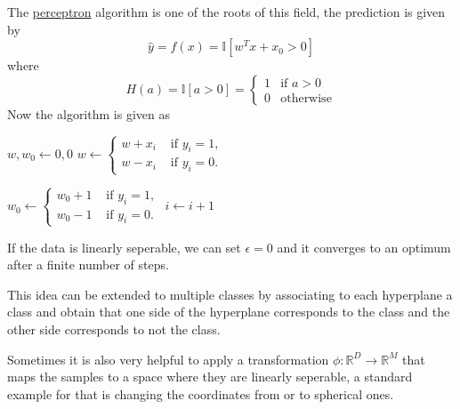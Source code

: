 \documentclass[12 pt]{article}        	%
\begin{document}
\begin{lem}
    The \underline{perceptron} algorithm is one of the roots of this field, the prediction is given by 
    \[
        \hat{y} = f ( x ) = \mathbb{ I } [ w^T x + x_0 > 0 ]
    \]
    where
    \[
        H ( a ) = \mathbb{ I }[ a > 0 ] = 
        \begin{cases}
            1 & \text{if } a > 0
            \\
            0 & \text{otherwise}
        \end{cases}
    \]
    Now the algorithm is given as 
    \begin{algorithmic}
        \State $w ,w_0 \gets 0 , 0 $
                    \State $w \gets \begin{cases}
                         w + x_i  & \text{ if } y_i = 1,
                        \\
                        w - x_i & \text{ if } y_i = 0.
                    \end{cases}$
    
                    \State $w_0 \gets \begin{cases}
                        w_0 + 1  & \text{ if } y_i = 1,
                        \\
                        w_0 - 1 & \text{ if } y_i = 0.
                    \end{cases} $
                    \EndIf
                \State $ i \gets i + 1 $
                \EndFor
            \EndWhile
    \end{algorithmic}
    If the data is linearly seperable, we can set $ \epsilon = 0 $ and it converges to an optimum after a finite number of steps.
\end{lem}

This idea can be extended to multiple classes by associating to each hyperplane a class and obtain that one side of the hyperplane corresponds to the class and the other side corresponds to not the class.

Sometimes it is also very helpful to apply a transformation $ \phi \colon \mathbb{ R }^D \to \mathbb{ R }^M $ that maps the samples to a space where they are linearly seperable, a standard example for that is changing the coordinates from or to spherical ones.
\end{document}
